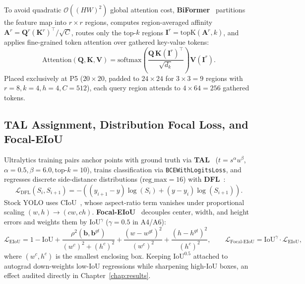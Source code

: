To avoid quadratic $\mathcal{O}((HW)^2)$ global attention cost, \textbf{BiFormer}~\cite{zhu2023biformer} partitions the feature map into $r \times r$ regions, computes region-averaged affinity $\mathbf{A}^r = \mathbf{Q}^r (\mathbf{K}^r)^\top / \sqrt{C}$, routes only the top-$k$ regions $\mathbf{I}^r = \mathrm{topK}(\mathbf{A}^r, k)$, and applies fine-grained token attention over gathered key-value tokens:
\begin{equation}
\mathrm{Attention}(\mathbf{Q}, \mathbf{K}, \mathbf{V}) = \mathrm{softmax}\!\left(\frac{\mathbf{Q}\,\mathbf{K}(\mathbf{I}^r)^\top}{\sqrt{d_k}}\right)\mathbf{V}(\mathbf{I}^r).
\label{eq:sota_biformer}
\end{equation}
Placed exclusively at P5 ($20 \times 20$, padded to $24 \times 24$ for $3 \times 3 = 9$ regions with $r=8, k=4, h=4, C=512$), each query region attends to $4 \times 64 = 256$ gathered tokens.

\subsection{TAL Assignment, Distribution Focal Loss, and Focal-EIoU}

Ultralytics training pairs anchor points with ground truth via \textbf{TAL}~\cite{feng2021tood} ($t = s^{\alpha} u^{\beta}$, $\alpha=0.5, \beta=6.0, \text{top-}k=10$), trains classification via \texttt{BCEWithLogitsLoss}, and regresses discrete side-distance distributions ($\text{reg\_max}=16$) with \textbf{DFL}~\cite{li2020generalized}:
\begin{equation}
\mathcal{L}_{\text{DFL}}(S_i, S_{i+1}) = -\left((y_{i+1} - y)\log(S_i) + (y - y_i)\log(S_{i+1})\right).
\label{eq:sota_dfl}
\end{equation}
Stock YOLO uses CIoU~\cite{zheng2020distance}, whose aspect-ratio term vanishes under proportional scaling $(w,h) \to (cw,ch)$. \textbf{Focal-EIoU}~\cite{zhang2022focal} decouples center, width, and height errors and weights them by $\mathrm{IoU}^{\gamma}$ ($\gamma=0.5$ in A4/A6):
\begin{equation}
\mathcal{L}_{\text{EIoU}} = 1 - \mathrm{IoU} + \frac{\rho^2(\mathbf{b}, \mathbf{b}^{gt})}{(w^c)^2 + (h^c)^2} + \frac{(w - w^{gt})^2}{(w^c)^2} + \frac{(h - h^{gt})^2}{(h^c)^2}, \qquad \mathcal{L}_{\text{Focal-EIoU}} = \mathrm{IoU}^{\gamma} \cdot \mathcal{L}_{\text{EIoU}},
\label{eq:sota_focal_eiou}
\end{equation}
where $(w^c, h^c)$ is the smallest enclosing box. Keeping $\mathrm{IoU}^{0.5}$ attached to autograd down-weights low-IoU regressions while sharpening high-IoU boxes, an effect audited directly in Chapter~\ref{chap:results}.

